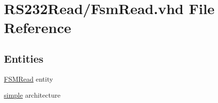 \hypertarget{_fsm_read_8vhd}{}\section{R\+S232\+Read/\+Fsm\+Read.vhd File Reference}
\label{_fsm_read_8vhd}
\subsection*{Entities}
\begin{DoxyCompactItemize}
\item 
\hyperlink{class_f_s_m_read}{F\+S\+M\+Read} entity
\item 
\hyperlink{class_f_s_m_read_1_1simple}{simple} architecture
\end{DoxyCompactItemize}
